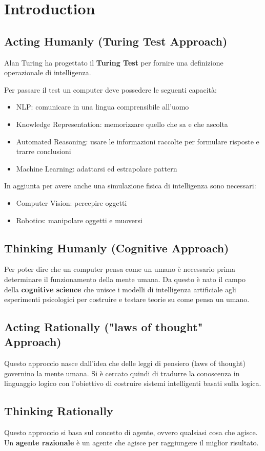 \chapter{Introduction}

\section{Acting Humanly (Turing Test Approach)}
Alan Turing ha progettato il \textbf{Turing Test} 
per fornire una definizione operazionale di intelligenza.

Per passare il test un computer deve possedere le seguenti capacità:
\begin{itemize}
  \item NLP: comunicare in una lingua comprensibile all'uomo
  \item Knowledge Representation: memorizzare quello che sa e che ascolta
  \item Automated Reasoning: usare le informazioni raccolte per formulare risposte e trarre conclusioni
  \item Machine Learning: adattarsi ed estrapolare pattern
\end{itemize}
In aggiunta per avere anche una simulazione fisica di intelligenza sono necessari:
\begin{itemize}
  \item Computer Vision: percepire oggetti
  \item Robotics: manipolare oggetti e muoversi
\end{itemize}

\section{Thinking Humanly (Cognitive Approach)}
Per poter dire che un computer pensa come un umano è necessario prima determinare il funzionamento della mente umana.
Da questo è nato il campo della \textbf{cognitive science} che unisce i modelli di intelligenza artificiale agli esperimenti psicologici
per costruire e testare teorie su come pensa un umano. 

\section{Acting Rationally ("laws of thought" Approach)}
Questo approccio nasce dall'idea che delle leggi di pensiero (laws of thought) governino la mente umana.
Si è cercato quindi di tradurre la conoscenza in linguaggio logico con l'obiettivo di costruire sistemi intelligenti
basati sulla logica.

\section{Thinking Rationally}
Questo approccio si basa sul concetto di agente, ovvero qualsiasi cosa che agisce. 
Un \textbf{agente razionale} è un agente che agisce per raggiungere il miglior risultato.
